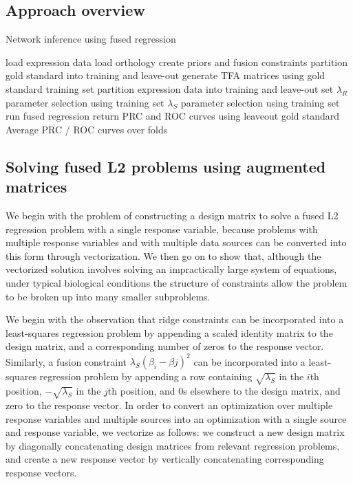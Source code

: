 \documentclass[11pt]{article}
\begin{document}
\subsection{Approach overview}
\begin{algorithm}
\caption{Network inference using fused regression}\label{euclid}
\begin{algorithmic}[1]
\State load expression data
\State load orthology
\State create priors and fusion constraints
\State partition gold standard into training and leave-out
\State generate TFA matrices using gold standard training set
	\State partition expression data into training and leave-out set
	\State $\lambda_R$ parameter selection using training set
	\State $\lambda_S$ parameter selection using training set
	\State run fused regression
	\State return PRC and ROC curves using leaveout gold standard
	\EndFor
\State Average PRC / ROC curves over folds
\EndProcedure
\end{algorithmic}
\end{algorithm}

\subsection{Solving fused L2 problems using augmented matrices}
We begin with the problem of constructing a design matrix to solve a fused L2 regression problem with a single response variable, because problems with multiple response variables and with multiple data sources can be converted into this form through vectorization. We then go on to show that, although the vectorized solution involves solving an impractically large system of equations, under typical biological conditions the structure of constraints allow the problem to be broken up into many smaller subproblems. 

We begin with the observation that ridge constraints can be incorporated into a least-squares regression problem by appending a scaled identity matrix to the design matrix, and a corresponding number of zeros to the response vector. Similarly, a fusion constraint $\lambda_S (\beta_{i} - \beta{j})^2$ can be incorporated into a least-squares regression problem by appending a row containing $\sqrt{\lambda_S}$ in the $i$th position, $-\sqrt{\lambda_S}$ in the $j$th position, and $0$s elsewhere to the design matrix, and zero to the response vector. In order to convert an optimization over multiple response variables and multiple sources into an optimization with a single source and response variable, we vectorize as follows: we construct a new design matrix by diagonally concatenating design matrices from relevant regression problems, and create a new response vector by vertically concatenating corresponding response vectors. 
\end{document}
